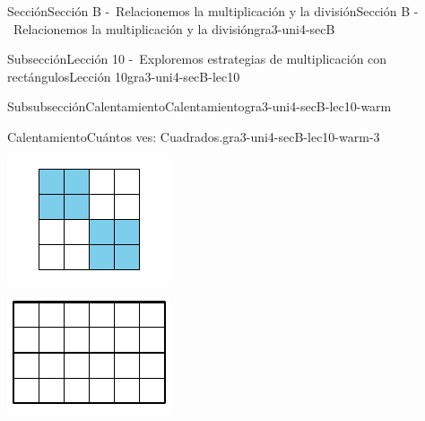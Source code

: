 \documentclass[twoside,10pt,]{article}
\begin{document}
\begin{sectionptx}{Sección}{Sección B -~Relacionemos la multiplicación y la división}{}{Sección B -~Relacionemos la multiplicación y la división}{}{}{gra3-uni4-secB}
\begin{subsectionptx}{Subsección}{Lección 10 -~Exploremos estrategias de multiplicación con rectángulos}{}{Lección 10}{}{}{gra3-uni4-secB-lec10}
\begin{subsubsectionptx}{Subsubsección}{Calentamiento}{}{Calentamiento}{}{}{gra3-uni4-secB-lec10-warm}
\begin{exploration}{Calentamiento}{Cuántos ves: Cuadrados.}{gra3-uni4-secB-lec10-warm-3}
\begin{image}{0}{1}{0}{}
\includegraphics[width=\linewidth]{external/svg-source/tikz-file-147481.pdf}
\end{image}%
\begin{image}{0}{1}{0}{}%
\includegraphics[width=\linewidth]{external/svg-source/tikz-file-141805.pdf}
\end{image}%
\begin{image}{0}{1}{0}{}%

\end{image}
\end{exploration}
\end{subsubsectionptx}
\end{subsectionptx}
\end{sectionptx}
\end{document}
